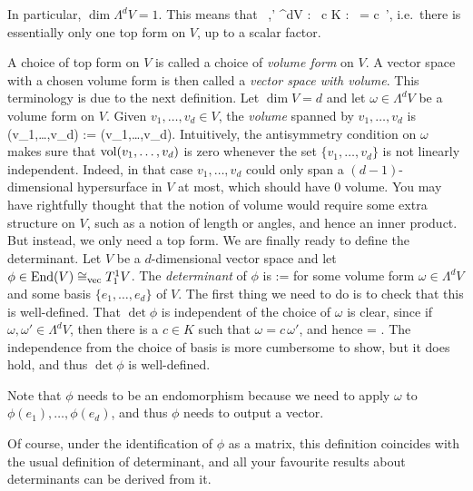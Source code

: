In particular, $\dim \Lambda^dV=1$. This means that
\bse
\forall \, \omega,\omega' \in \Lambda^dV : \exists \, c \in K : \ \omega = c\, \omega',
\ese
i.e.\ there is essentially only one top form on $V$, up to a scalar factor.

\bd
A choice of top form on $V$ is called a choice of \emph{volume form} on $V$. A vector space with a chosen volume form is then called a \emph{vector space with volume}.
\ed
This terminology is due to the next definition.
\bd
Let $\dim V = d$ and let $\omega \in \Lambda^dV$ be a volume form on $V$. Given $v_1,\ldots,v_d\in V$, the \emph{volume} spanned by $v_1,\ldots,v_d$ is
\bse
\vol(v_1,\ldots,v_d) := \omega(v_1,\ldots,v_d).
\ese
\ed
Intuitively, the antisymmetry condition on $\omega$ makes sure that $\operatorname{vol}(v_1,\ldots,v_d)$ is zero whenever the set $\{v_1,\ldots,v_d\}$ is not linearly independent. Indeed, in that case $v_1,\ldots,v_d$ could only span a $(d-1)$-dimensional hypersurface in $V$ at most, which should have $0$ volume. 
\br
You may have rightfully thought that the notion of volume would require some extra structure on $V$, such as a notion of length or angles, and hence an inner product. But instead, we only need a top form.
\er
We are finally ready to define the determinant.
\bd
Let $V$ be a $d$-dimensional vector space and let $\phi \in \operatorname{End} (V) \cong_\mathrm{vec}T^1_1V$. The \emph{determinant} of $\phi$ is
\bse
\det \phi := 
\ese
for some volume form $\omega \in \Lambda^dV$ and some basis $\{e_1,\ldots,e_d\}$ of $V$.
\ed
The first thing we need to do is to check that this is well-defined. That $\det \phi$ is independent of the choice of $\omega$ is clear, since if $\omega,\omega' \in \Lambda^dV$, then there is a $c \in K$ such that $\omega = c\, \omega'$, and hence 
\bse
  =  .
\ese
The independence from the choice of basis is more cumbersome to show, but it does hold, and thus $\det \phi$ is well-defined.

Note that $\phi$ needs to be an endomorphism because we need to apply $\omega$ to $\phi(e_1),\ldots,\phi(e_d)$, and thus $\phi$ needs to output a vector.

Of course, under the identification of $\phi$ as a matrix, this definition coincides with the usual definition of determinant, and all your favourite results about determinants can be derived from it. 

